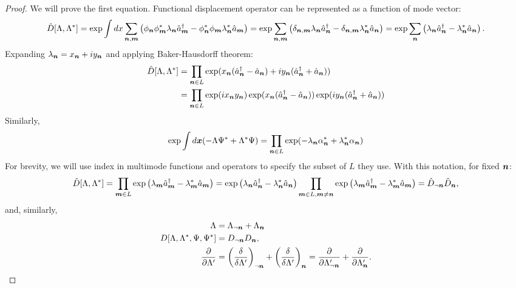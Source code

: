 \begin{proof}
We will prove the first equation.
Functional displacement operator can be represented as a function of mode vector:
\begin{equation*}
\begin{split}
	\hat{D}[\Lambda, \Lambda^*]
	= \exp \int dx \sum\limits_{\boldsymbol{n},\boldsymbol{m}} \left(
		\phi_{\boldsymbol{n}} \phi_{\boldsymbol{m}}^* \lambda_{\boldsymbol{n}} \hat{a}_{\boldsymbol{m}}^\dagger
		- \phi_{\boldsymbol{n}}^* \phi_{\boldsymbol{m}} \lambda_{\boldsymbol{n}}^* \hat{a}_{\boldsymbol{m}}
	\right)
	= \exp \sum\limits_{\boldsymbol{n},\boldsymbol{m}} \left(
		\delta_{\boldsymbol{n},\boldsymbol{m}} \lambda_{\boldsymbol{n}} \hat{a}_{\boldsymbol{n}}^\dagger
		- \delta_{\boldsymbol{n},\boldsymbol{m}} \lambda_{\boldsymbol{n}}^* \hat{a}_{\boldsymbol{n}}
	\right)
	= \exp \sum\limits_{\boldsymbol{n}} \left(
		\lambda_{\boldsymbol{n}} \hat{a}_{\boldsymbol{n}}^\dagger - \lambda_{\boldsymbol{n}}^* \hat{a}_{\boldsymbol{n}}
	\right).
\end{split}
\end{equation*}
Expanding $\lambda_{\boldsymbol{n}} = x_{\boldsymbol{n}} + iy_{\boldsymbol{n}}$ and applying Baker-Hausdorff theorem:
\begin{equation*}
\begin{split}
	\hat{D}[\Lambda, \Lambda^*]
	& = \prod\limits_{\boldsymbol{n} \in L}
		\exp(x_{\boldsymbol{n}}(\hat{a}_{\boldsymbol{n}}^\dagger - \hat{a}_{\boldsymbol{n}})
		+ iy_{\boldsymbol{n}}(\hat{a}_{\boldsymbol{n}}^\dagger + \hat{a}_{\boldsymbol{n}})) \\
	& = \prod\limits_{\boldsymbol{n} \in L}
		\exp(ix_{\boldsymbol{n}}y_{\boldsymbol{n}})
		\exp(x_{\boldsymbol{n}}(\hat{a}_{\boldsymbol{n}}^\dagger - \hat{a}_{\boldsymbol{n}}))
		\exp(iy_{\boldsymbol{n}}(\hat{a}_{\boldsymbol{n}}^\dagger + \hat{a}_{\boldsymbol{n}}))
\end{split}
\end{equation*}
Similarly,
\[
	\exp \int d\boldsymbol{x} (-\Lambda \Psi^* + \Lambda^* \Psi)
	= \prod\limits_{\boldsymbol{n} \in L} \exp
		(-\lambda_{\boldsymbol{n}} \alpha_{\boldsymbol{n}}^* + \lambda_{\boldsymbol{n}}^* \alpha_{\boldsymbol{n}})
\]
For brevity, we will use index in multimode functions and operators to specify the subset of $L$ they use.
With this notation, for fixed $\boldsymbol{n}$:
\[
	\hat{D}[\Lambda, \Lambda^*]
	= \prod\limits_{\boldsymbol{m} \in L} \exp \left(
		\lambda_{\boldsymbol{m}} \hat{a}_{\boldsymbol{m}}^\dagger - \lambda_{\boldsymbol{m}}^* \hat{a}_{\boldsymbol{m}}
	\right)
	= \exp \left(
		\lambda_{\boldsymbol{n}} \hat{a}_{\boldsymbol{n}}^\dagger - \lambda_{\boldsymbol{n}}^* \hat{a}_{\boldsymbol{n}}
	\right)
	\prod\limits_{\boldsymbol{m} \in L, \boldsymbol{m} \ne \boldsymbol{n}} \exp \left(
		\lambda_{\boldsymbol{m}} \hat{a}_{\boldsymbol{m}}^\dagger - \lambda_{\boldsymbol{m}}^* \hat{a}_{\boldsymbol{m}}
	\right)
	= \hat{D}_{\lnot \boldsymbol{n}} \hat{D}_{\boldsymbol{n}},
\]
and, similarly,
\begin{equation*}
\begin{split}
	\Lambda & = \Lambda_{\lnot \boldsymbol{n}} + \Lambda_{\boldsymbol{n}} \\
	D[\Lambda, \Lambda^*, \Psi, \Psi^*]	& = D_{\lnot \boldsymbol{n}} D_{\boldsymbol{n}}, \\
	\frac{\partial}{\partial \Lambda^\prime}
	& = \left( \frac{\delta}{\delta \Lambda^\prime} \right)_{\lnot \boldsymbol{n}}
	+ \left( \frac{\delta}{\delta \Lambda^\prime} \right)_{\boldsymbol{n}}
	= \frac{\partial}{\partial \Lambda_{\lnot \boldsymbol{n}}^\prime}
	+ \frac{\partial}{\partial \Lambda_{\boldsymbol{n}}^\prime}.
\end{split}
\end{equation*}


\end{proof}
